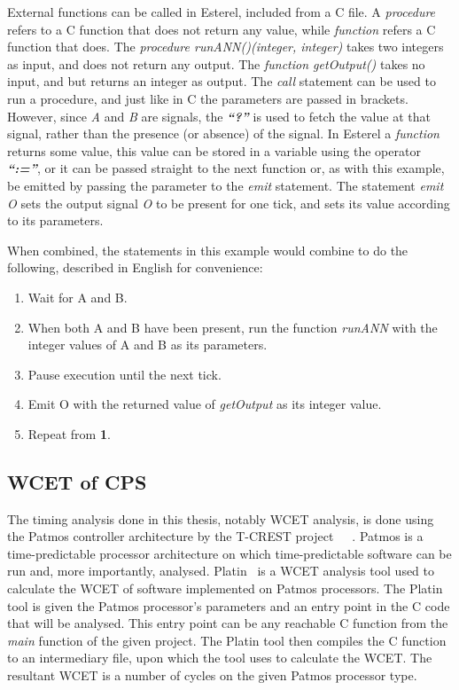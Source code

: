 External functions can be called in Esterel, included from a C file.
A \textit{procedure} refers to a C function that does not return any value, while \textit{function} refers a C function that does.
The \textit{procedure runANN()(integer, integer)} takes two integers as input, and does not return any output.
The \textit{function getOutput()} takes no input, and but returns an integer as output.
The \textit{call} statement can be used to run a procedure, and just like in C the parameters are passed in brackets.
However, since \textit{A} and \textit{B} are signals, the \textbf{\emph{``?''}} is used to fetch the value at that signal, rather than the presence (or absence) of the signal.
In Esterel a \textit{function} returns some value, this value can be stored in a variable using the operator \textbf{\emph{``:=''}}, or it can be passed straight to the next function or, as with this example, be emitted by passing the parameter to the \textit{emit} statement.
The statement \textit{emit O} sets the output signal \textit{O} to be present for one tick, and sets its value according to its parameters.

When combined, the statements in this example would combine to do the following, described in English for convenience:
\begin{enumerate}
	\item Wait for A and B. 
	\item When both A and B have been present, run the function \textit{runANN} with the integer values of A and B as its parameters.
	\item Pause execution until the next tick.
	\item Emit O with the returned value of \textit{getOutput} as its integer value.
	\item Repeat from \textbf{1}.
\end{enumerate}

\subsection{\acf{WCET} of \acf{CPS}}
The timing analysis done in this thesis, notably \acf{WCET} analysis, is done using the Patmos controller architecture by the T-CREST project~\cite{TCREST}~\cite{patmos:ppes2011}~\cite{patmos}.
Patmos is a time-predictable processor architecture on which time-predictable software can be run and, more importantly, analysed.
Platin~\cite{compiler:platin:kps15} is a \acf{WCET} analysis tool used to calculate the \ac{WCET} of software implemented on Patmos processors.
The Platin tool is given the Patmos processor's parameters and an entry point in the C code that will be analysed.
This entry point can be any reachable C function from the \textit{main} function of the given project.
The Platin tool then compiles the C function to an intermediary file, upon which the tool uses to calculate the \ac{WCET}.
The resultant \ac{WCET} is a number of cycles on the given Patmos processor type.

